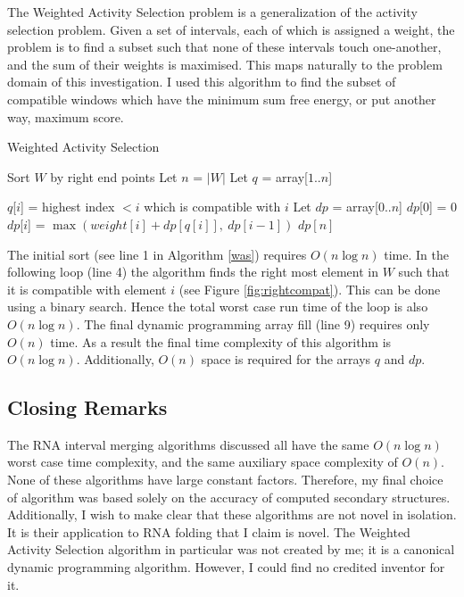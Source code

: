 \documentclass{cshonours}
\begin{document}
The Weighted Activity Selection problem is a generalization of the activity selection problem. Given a set of intervals, each of which is assigned a weight, the problem is to find a subset such that none of these intervals touch one-another, and the sum of their weights is maximised. This maps naturally to the problem domain of this investigation. I used this algorithm to find the subset of compatible windows which have the minimum sum free energy, or put another way, maximum score.

\begin{algorithm}
  \caption{Weighted Activity Selection}
  \label{was}
  \begin{algorithmic}[1]
  \State Sort $W$ by right end points
  \State Let $n$ = $|W|$
  \State Let $q$ = array[$1..n$]
  
  	\State $q$[$i$] = highest index $< i$ which is compatible with $i$
  \EndFor
  \State Let $dp$ = array[$0..n$]  
  \State $dp$[0] = 0
  	\State $dp$[$i$] = $\max (weight[i] + dp[q[i]], \: dp[i-1])$
  \EndFor
  \State \Return $dp[n]$
  \end{algorithmic}
\end{algorithm}

The initial sort (see line 1 in Algorithm \ref{was}) requires $O(n \log n)$ time. In the following loop (line 4) the algorithm finds the right most element in $W$ such that it is compatible with element $i$ (see Figure \ref{fig:rightcompat}). This can be done using a binary search. Hence the total worst case run time of the loop is also $O(n \log n)$. The final dynamic programming array fill (line 9) requires only $O(n)$ time. As a result the final time complexity of this algorithm is $O(n \log n)$. Additionally, $O(n)$ space is required for the arrays $q$ and $dp$.


\subsection{Closing Remarks}

The RNA interval merging algorithms discussed all have the same $O(n \log n)$ worst case time complexity, and the same auxiliary space complexity of $O(n)$. None of these algorithms have large constant factors. Therefore, my final choice of algorithm was based solely on the accuracy of computed secondary structures. Additionally, I wish to make clear that these algorithms are not novel in isolation. It is their application to RNA folding that I claim is novel. The Weighted Activity Selection algorithm in particular was not created by me; it is a canonical dynamic programming algorithm. However, I could find no credited inventor for it.
\end{document}
